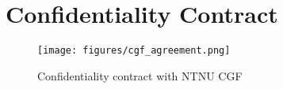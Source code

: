 \chapter{Confidentiality Contract}
\label{app:conf}

\begin{figure}[h]
    \centering
    \texttt{[image: figures/cgf\_agreement.png]}
    \caption{Confidentiality contract with NTNU CGF}
    \label{fig:agreement}
\end{figure}